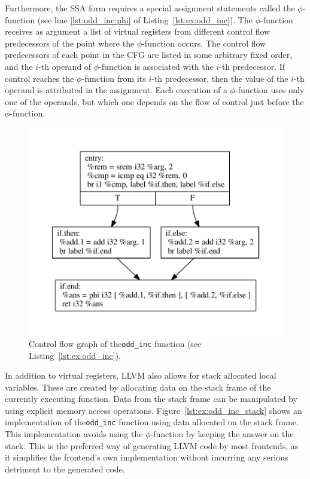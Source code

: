 Furthermore, the SSA form requires a special assignment statements called the $\phi$-function (see line \ref{lst:odd_inc:phi} of Listing~\ref{lst:ex:odd_inc}).
The $\phi$-function receives as argument a list of virtual registers from different  control flow predecessors of the point where the $\phi$-function occurs.
The control flow predecessors of each point in the CFG are listed in some arbitrary fixed order, and the $i$-th operand of $\phi$-function is associated with the $i$-th predecessor.
If control reaches the $\phi$-function from its $i$-th predecessor, then the value of the $i$-th operand is attributed in the assignment.
Each execution of a $\phi$-function uses only one of the operands, but which one depends on the flow of control just before the $\phi$-function.

\begin{figure}[h]
  \centering
  \includegraphics[scale=0.7]{figs/cfg-odd_inc.pdf}
  \caption{Control flow graph of the\lstinline[language=llvm,style=nasm]{odd_inc} function (see Listing~\ref{lst:ex:odd_inc}).}
  \label{fig:cfg-odd_inc}
\end{figure}

In addition to virtual registers, LLVM also allows for stack allocated local variables.
These are created by allocating data on the stack frame of the currently executing function.
Data from the stack frame can be manipulated by using explicit memory access operations.
Figure~\ref{lst:ex:odd_inc_stack} shows an implementation of the\lstinline[language=llvm,style=nasm]{odd_inc} function using data allocated on the stack frame.
This implementation avoids using the $\phi$-function by keeping the answer on the stack.
This is the preferred way of generating LLVM code by most frontends, as it simplifies the frontend's own implementation without incurring any serious detriment to the generated code.

